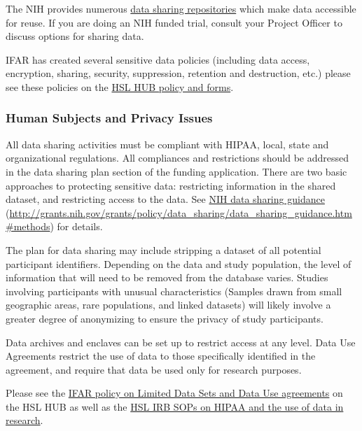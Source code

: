 \documentclass[]{book}
\begin{document}
The NIH provides numerous
\href{https://www.nlm.nih.gov/NIHbmic/nih_data_sharing_repositories.html}{data
sharing repositories} which make data accessible for reuse. If you are
doing an NIH funded trial, consult your Project Officer to discuss
options for sharing data.

IFAR has created several sensitive data policies (including data access,
encryption, sharing, security, suppression, retention and destruction,
etc.) please see these policies on the
\href{http://thehslhub/Departments/Roslindale/HSL-IFAR/Administration/Policies-and-Forms}{HSL
HUB policy and forms}.

\subsubsection{Human Subjects and Privacy
Issues}\label{human-subjects-and-privacy-issues}

All data sharing activities must be compliant with HIPAA, local, state
and organizational regulations. All compliances and restrictions should
be addressed in the data sharing plan section of the funding
application. There are two basic approaches to protecting sensitive
data: restricting information in the shared dataset, and restricting
access to the data. See
\href{file:////hebrewseniorlife.local/home/research-users/ElaineBergman/ISAC/Data\%20Sharing\%20Publication\%20and\%20dissemination}{NIH
data sharing guidance}
(\url{http://grants.nih.gov/grants/policy/data_sharing/data_sharing_guidance.htm\#methods})
for details.

The plan for data sharing may include stripping a dataset of all
potential participant identifiers. Depending on the data and study
population, the level of information that will need to be removed from
the database varies. Studies involving participants with unusual
characteristics (Samples drawn from small geographic areas, rare
populations, and linked datasets) will likely involve a greater degree
of anonymizing to ensure the privacy of study participants.

Data archives and enclaves can be set up to restrict access at any
level. Data Use Agreements restrict the use of data to those
specifically identified in the agreement, and require that data be used
only for research purposes.

Please see the
\href{http://thehslhub/Departments/Roslindale/HSL-IFAR/Administration/Policies-and-Forms}{IFAR
policy on Limited Data Sets and Data Use agreements} on the HSL HUB as
well as the
\href{http://thehslhub/Forms/Documents-and-Forms/IFAR/IFAR-IRB-SOP}{HSL
IRB SOPs on HIPAA and the use of data in research}.
\end{document}
